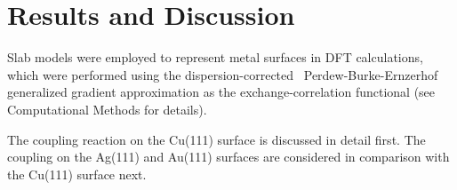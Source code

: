 \documentclass[aps,prb,amsmath,amssymb,11pt]{revtex4-1}
\newcommand*{\ACSNANO}{}
\begin{document}



\ifdefined\ACSNANO
\else

\fi


\section*{Results and Discussion}

\ifdefined\ACSNANO

Slab models were employed to represent metal surfaces in DFT calculations, which were performed using the dispersion-corrected~\cite{ullmann_136, ullmann_137} Perdew-Burke-Ernzerhof~\cite{ullmann_139} generalized gradient approximation as the exchange-correlation functional (see Computational Methods for details).

\fi

The coupling reaction on the Cu(111) surface is discussed in detail first. The coupling on the Ag(111) and Au(111) surfaces are considered in comparison with the Cu(111) surface next.
\end{document}
